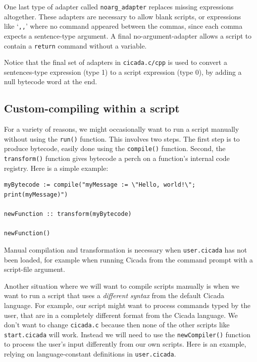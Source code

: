 \documentclass{article}
\newenvironment{code}{
       \begin{list}{}{
               \setlength{\leftmargin}{.4in}
               \setlength{\rightmargin}{0in}
               \setlength{\topsep}{.2in}
       }
       \small
       \item[] }
       { \end{list}   }
\begin{document}
One last type of adapter called \verb#noarg_adapter# replaces missing expressions altogether.  These adapters are necessary to allow blank scripts, or expressions like `\verb#,,#' where no command appeared between the commas, since each comma expects a sentence-type argument.  A final no-argument-adapter allows a script to contain a \verb#return# command without a variable.

Notice that the final set of adapters in \verb#cicada.c/cpp# is used to convert a sentences-type expression (type 1) to a script expression (type 0), by adding a null bytecode word at the end.\\


 



\subsection{Custom-compiling within a script}%

For a variety of reasons, we might occasionally want to run a script manually without using the \verb#run()# function.  This involves two steps.  The first step is to produce bytecode, easily done using the \verb#compile()# function.  Second, the \verb#transform()# function gives bytecode a perch on a function's internal code registry.  Here is a simple example:

\begin{code} \begin{verbatim}
myBytecode := compile("myMessage := \"Hello, world!\"; print(myMessage)")

newFunction :: transform(myBytecode)

newFunction()
\end{verbatim} \end{code}

\noindent Manual compilation and transformation is necessary when \verb#user.cicada# has not been loaded, for example when running Cicada from the command prompt with a script-file argument.

Another situation where we will want to compile scripts manually is when we want to run a script that uses a \emph{different syntax} from the default Cicada language.  For example, our script might want to process commands typed by the user, that are in a completely different format from the Cicada language.  We don't want to change \verb#cicada.c# because then none of the other scripts like \verb#start.cicada# will work.  Instead we will need to use the \verb#newCompiler()# function to process the user's input differently from our own scripts.  Here is an example, relying on language-constant definitions in \verb#user.cicada#.
\end{document}
